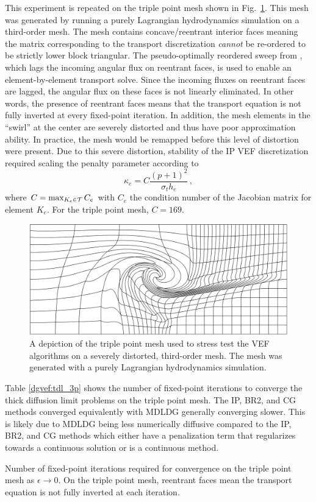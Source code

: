 \documentclass[../doc.tex]{subfiles}
\begin{document}
This experiment is repeated on the triple point mesh shown in Fig.~\ref{dgvef:3point_mesh}. This mesh was generated by running a purely Lagrangian hydrodynamics simulation on a third-order mesh. The mesh contains concave/reentrant interior faces meaning the matrix corresponding to the transport discretization \emph{cannot} be re-ordered to be strictly lower block triangular. The pseudo-optimally reordered sweep from \cite{graph_sweeps}, which lags the incoming angular flux on reentrant faces, is used to enable an element-by-element transport solve. Since the incoming fluxes on reentrant faces are lagged, the angular flux on these faces is not linearly eliminated. In other words, the presence of reentrant faces means that the transport equation is not fully inverted at every fixed-point iteration. In addition, the mesh elements in the ``swirl'' at the center are severely distorted and thus have poor approximation ability. In practice, the mesh would be remapped before this level of distortion were present. Due to this severe distortion, stability of the IP VEF discretization required scaling the penalty parameter according to 
	\begin{equation}
		\kappa_e = C \frac{(p+1)^2}{\sigma_t h_e} \,,
	\end{equation}	
where $C = \max_{K_e \in \mathcal{T}} C_e$ with $C_e$ the condition number of the Jacobian matrix for element $K_e$. For the triple point mesh, $C=169$.
\begin{figure}
\centering
\includegraphics[width=.65\textwidth]{data/img/3point.png}
\caption{A depiction of the triple point mesh used to stress test the VEF algorithms on a severely distorted, third-order mesh. The mesh was generated with a purely Lagrangian hydrodynamics simulation. }
\label{dgvef:3point_mesh}
\end{figure}

Table \ref{dgvef:tdl_3p} shows the number of fixed-point iterations to converge the thick diffusion limit problems on the triple point mesh. The IP, BR2, and CG methods converged equivalently with MDLDG generally converging slower. This is likely due to MDLDG being less numerically diffusive compared to the IP, BR2, and CG methods which either have a penalization term that regularizes towards a continuous solution or is a continuous method. 
\begin{table}
\centering
\caption{Number of fixed-point iterations required for convergence on the triple point mesh as $\epsilon \rightarrow 0$. On the triple point mesh, reentrant faces mean the transport equation is not fully inverted at each iteration.}
\label{dgvef:tdl_3p}

\end{table}
\end{document}
